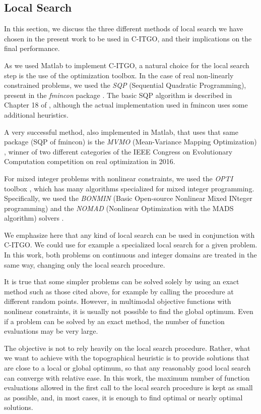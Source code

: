\subsection{Local Search}

In this section, we discuss the three different methods of local search we have chosen in the present work to be used in C-ITGO, and their implications on the final performance.

As we used Matlab to implement C-ITGO, a natural choice for the local search step is the use of the optimization toolbox. In the case of real non-linearly constrained problems, we used the \textit{SQP} (Sequential Quadratic Programming), present in the \textit{fmincon} package \citep{fmincon}. The basic SQP algorithm is described in Chapter 18 of \cite{Nocedal}, although the actual implementation used in fmincon uses some additional heuristics. 

A very successful method, also implemented in Matlab, that uses that same package (SQP of fmincon) is the \textit{MVMO} (Mean-Variance Mapping Optimization) \citep{MVMO}, winner of two different categories of the IEEE Congress on Evolutionary Computation competition on real optimization in 2016.

For mixed integer problems with nonlinear constraints, we used the \textit{OPTI} toolbox \citep{OPTI}, which has many algorithms specialized for mixed integer programming. Specifically, we used the \textit{BONMIN} (Basic Open-source Nonlinear Mixed INteger programming) \citep{BONMIN} and the \textit{NOMAD} (Nonlinear Optimization with the MADS algorithm) solvers \citep{NOMAD}.

We emphasize here that any kind of local search can be used in conjunction with C-ITGO. We could use for example a specialized local search for a given problem. In this work, both problems on continuous and integer domains are treated in the same way, changing only the local search procedure.

It is true that some simpler problems can be solved solely by using an exact method such as those cited above, for example by calling the procedure at different random points. However, in multimodal objective functions with nonlinear constraints, it is usually not possible to find the global optimum. Even if a problem can be solved by an exact method, the number of function evaluations may be very large.

The objective is not to rely heavily on the local search procedure. Rather, what we want to achieve with the topographical heuristic is to provide solutions that are close to a local or global optimum, so that any reasonably good local search can converge with relative ease. In this work, the maximum number of function evaluations allowed in the first call to the local search procedure is kept as small as possible, and, in most cases, it is enough to find optimal or nearly optimal solutions.



